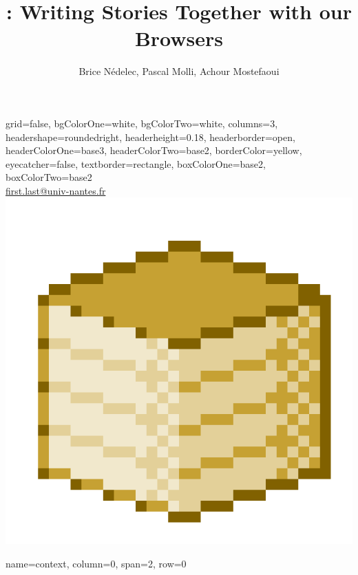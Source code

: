 \documentclass[a1paper, portrait]{baposter}
\title{\CRATE: Writing Stories Together with our Browsers}
\author{Brice Nédelec, Pascal Molli, Achour Mostefaoui}
\begin{document}
\begin{poster}{
    grid=false,
    bgColorOne=white,
    bgColorTwo=white,
    columns=3,
    headershape=roundedright, 
    headerheight=0.18\textheight,
    headerborder=open,
    headerColorOne=base3,
    headerColorTwo=base2,
    borderColor=yellow,
    eyecatcher=false,
    textborder=rectangle,
    boxColorOne=base2,
    boxColorTwo=base2
  }
  {}
  {\huge\textsc{\thetitle}\vspace{0.2em}}
  {\theauthor \\ \url{first.last@univ-nantes.fr}}
  {\includegraphics[height=0.16\textheight, interpolate=false]{logos/crateicon.png}}

  {name=context, column=0, span=2, row=0}
  {
  }

\end{poster}
\end{document}
